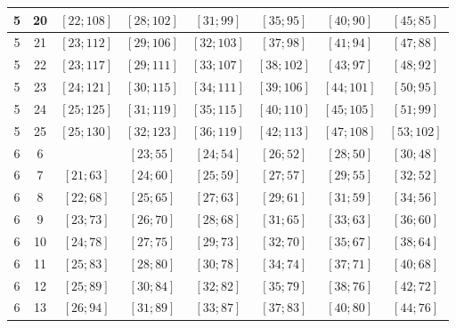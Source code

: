 \documentclass[a4paper,12pt]{article}
\begin{document}
\begin{center}
{\begin{longtable}[H]{|c|c|c|c|c|c|c|c|}
5 &  20 &  $\left[ 22; 108\right]$ &  $\left[ 28; 102\right]$ &  $\left[ 31; 99\right]$ &  $\left[ 35; 95\right]$ &  $\left[ 40; 90\right]$ &  $\left[ 45; 85\right]$ \tabularnewline \hline
5 &  21 &  $\left[ 23; 112\right]$ &  $\left[ 29; 106\right]$ &  $\left[ 32; 103\right]$ &  $\left[ 37; 98\right]$ &  $\left[ 41; 94\right]$ &  $\left[ 47; 88\right]$ \tabularnewline \hline
5 &  22 &  $\left[ 23; 117\right]$ &  $\left[ 29; 111\right]$ &  $\left[ 33; 107\right]$ &  $\left[ 38; 102\right]$ &  $\left[ 43; 97\right]$ &  $\left[ 48; 92\right]$ \tabularnewline \hline
5 &  23 &  $\left[ 24; 121\right]$ &  $\left[ 30; 115\right]$ &  $\left[ 34; 111\right]$ &  $\left[ 39; 106\right]$ &  $\left[ 44; 101\right]$ &  $\left[ 50; 95\right]$ \tabularnewline \hline
5 &  24 &  $\left[ 25; 125\right]$ &  $\left[ 31; 119\right]$ &  $\left[ 35; 115\right]$ &  $\left[ 40; 110\right]$ &  $\left[ 45; 105\right]$ &  $\left[ 51; 99\right]$ \tabularnewline \hline
5 &  25 &  $\left[ 25; 130\right]$ &  $\left[ 32; 123\right]$ &  $\left[ 36; 119\right]$ &  $\left[ 42; 113\right]$ &  $\left[ 47; 108\right]$ &  $\left[ 53; 102\right]$ \tabularnewline \hline
6 &  6 &   &  $\left[ 23; 55\right]$ &  $\left[ 24; 54\right]$ &  $\left[ 26; 52\right]$ &  $\left[ 28; 50\right]$ &  $\left[ 30; 48\right]$ \tabularnewline \hline
6 &  7 &  $\left[ 21; 63\right]$ &  $\left[ 24; 60\right]$ &  $\left[ 25; 59\right]$ &  $\left[ 27; 57\right]$ &  $\left[ 29; 55\right]$ &  $\left[ 32; 52\right]$ \tabularnewline \hline
6 &  8 &  $\left[ 22; 68\right]$ &  $\left[ 25; 65\right]$ &  $\left[ 27; 63\right]$ &  $\left[ 29; 61\right]$ &  $\left[ 31; 59\right]$ &  $\left[ 34; 56\right]$ \tabularnewline \hline
6 &  9 &  $\left[ 23; 73\right]$ &  $\left[ 26; 70\right]$ &  $\left[ 28; 68\right]$ &  $\left[ 31; 65\right]$ &  $\left[ 33; 63\right]$ &  $\left[ 36; 60\right]$ \tabularnewline \hline
6 &  10 &  $\left[ 24; 78\right]$ &  $\left[ 27; 75\right]$ &  $\left[ 29; 73\right]$ &  $\left[ 32; 70\right]$ &  $\left[ 35; 67\right]$ &  $\left[ 38; 64\right]$ \tabularnewline \hline
6 &  11 &  $\left[ 25; 83\right]$ &  $\left[ 28; 80\right]$ &  $\left[ 30; 78\right]$ &  $\left[ 34; 74\right]$ &  $\left[ 37; 71\right]$ &  $\left[ 40; 68\right]$ \tabularnewline \hline
6 &  12 &  $\left[ 25; 89\right]$ &  $\left[ 30; 84\right]$ &  $\left[ 32; 82\right]$ &  $\left[ 35; 79\right]$ &  $\left[ 38; 76\right]$ &  $\left[ 42; 72\right]$ \tabularnewline \hline
6 &  13 &  $\left[ 26; 94\right]$ &  $\left[ 31; 89\right]$ &  $\left[ 33; 87\right]$ &  $\left[ 37; 83\right]$ &  $\left[ 40; 80\right]$ &  $\left[ 44; 76\right]$ \tabularnewline \hline

\end{longtable}}
\end{center}
\end{document}
